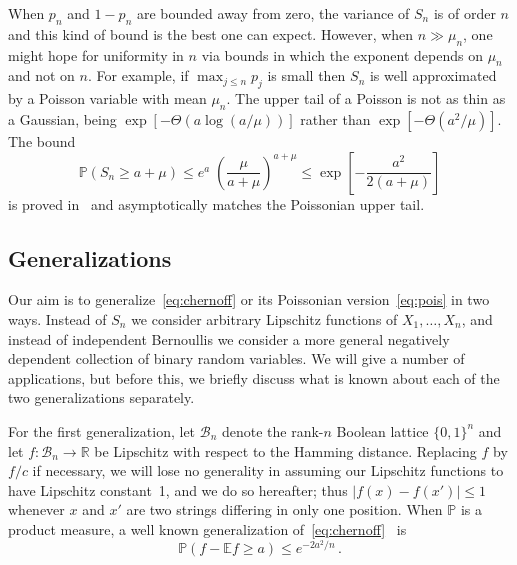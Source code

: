 \documentclass[10pt]{article}
\theoremstyle{plain}
\theoremstyle{remark}
\def\R{\mathbb{R}}
\def\E{{\mathbb E}}
\def\P{{\mathbb P}}
\def\B{{\mathcal B}}
\def\mean{\mu}
\begin{document}
When $p_n$ and $1 - p_n$ are bounded away from zero, the
variance of $S_n$ is of order $n$ and this kind of bound
is the best one can expect.  However, when $n \gg \mean_n$,
one might hope for uniformity in $n$ via bounds in which
the exponent depends on $\mean_n$ and not on $n$.  For example,
if $\max_{j \leq n} p_j$ is small then $S_n$ is well approximated
by a Poisson variable with mean $\mu_n$.
The upper tail of a Poisson is not as thin as a Gaussian,
being $\exp [ - \Theta (a \log (a/\mean))]$ rather than
$\exp [ - \Theta (a^2 / \mean)]$.  The bound
\begin{equation} \label{eq:pois}
\P (S_n \geq a + \mean) \leq
   e^a \; \left ( \frac{\mean}{a + \mean} \right )^{a + \mean} \leq
   \exp \left [ - \frac{a^2}{2 (a + \mean)} \right ]
\end{equation}
is proved in~\cite[Theorem~1]{hoeffding}
and asymptotically matches the Poissonian upper tail.

\subsection{Generalizations} \label{ss:gen}

Our aim is to generalize~\eqref{eq:chernoff} or its Poissonian
version~\eqref{eq:pois} in two ways.
Instead of $S_n$ we consider arbitrary Lipschitz functions of
$X_1 , \ldots , X_n$, and instead of independent Bernoullis
we consider a more general negatively dependent collection of
binary random variables.  We will give a number of applications,
but before this, we briefly discuss what is known about each
of the two generalizations separately.

For the first generalization, let $\B_n$ denote the rank-$n$
Boolean lattice $\{ 0 , 1 \}^n$ and let $f : \B_n \to \R$ be
Lipschitz with respect to the Hamming distance.  Replacing
$f$ by $f/c$ if necessary, we will lose no generality in
assuming our Lipschitz functions to have Lipschitz constant~1,
and we do so hereafter; thus $|f(x) - f(x')| \leq 1$ whenever
$x$ and $x'$ are two strings differing in only one position.
When $\P$ is a product measure, a well known generalization
of~\eqref{eq:chernoff}~\cite{mcdiarmid89} is
\begin{equation} \label{eq:gen 1}
\P (f - \E f \geq a) \leq e^{-2 a^2 / n} \, .
\end{equation}
\end{document}
